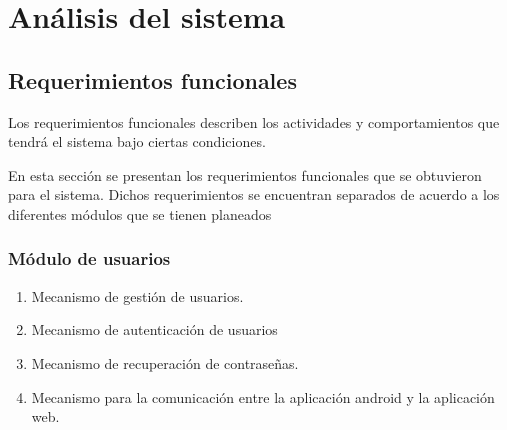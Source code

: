 \chapter{Análisis del sistema}

%

\section{Requerimientos funcionales}
    Los requerimientos funcionales describen los actividades y comportamientos que tendrá el sistema bajo ciertas condiciones.
    
    En esta sección se presentan los requerimientos funcionales que se obtuvieron para el sistema. Dichos requerimientos se encuentran separados de acuerdo a los diferentes módulos que se tienen planeados
    \subsection{Módulo de usuarios}
    \begin{enumerate}[label=RF\arabic*.]
    \item Mecanismo de gestión de usuarios.
    \item Mecanismo de autenticación de usuarios
    \item Mecanismo de recuperación de contraseñas.
    \item Mecanismo para la comunicación entre la aplicación android y la aplicación web.
    \end{enumerate}
    
